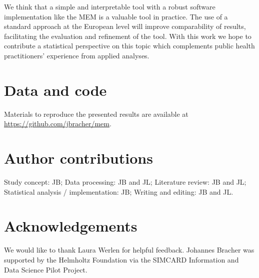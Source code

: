 \documentclass{article}
\begin{document}

We think that a simple and interpretable tool with a robust software implementation like the MEM is a valuable tool in practice. The use of a standard approach at the European level will improve comparability of results, facilitating the evaluation and refinement of the tool. With this work we hope to contribute a statistical perspective on this topic which complements public health practitioners' experience from applied analyses.


\section*{Data and code}

Materials to reproduce the presented results are available at \url{https://github.com/jbracher/mem}.

\section*{Author contributions}

Study concept: JB; Data processing: JB and JL; Literature review: JB and JL; Statistical analysis / implementation: JB; Writing and editing: JB and JL.


\section*{Acknowledgements}

We would like to thank Laura Werlen for helpful feedback. Johannes Bracher was supported by the Helmholtz Foundation via the SIMCARD Information and Data Science Pilot Project.



\end{document}
